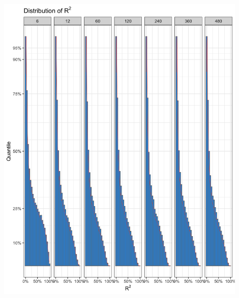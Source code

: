 \documentclass[]{article}
\begin{document}
\begin{center}
	\includegraphics[width=12cm, height=6\textheight]{"./1ai_chart"}
\end{center}
\end{document}
